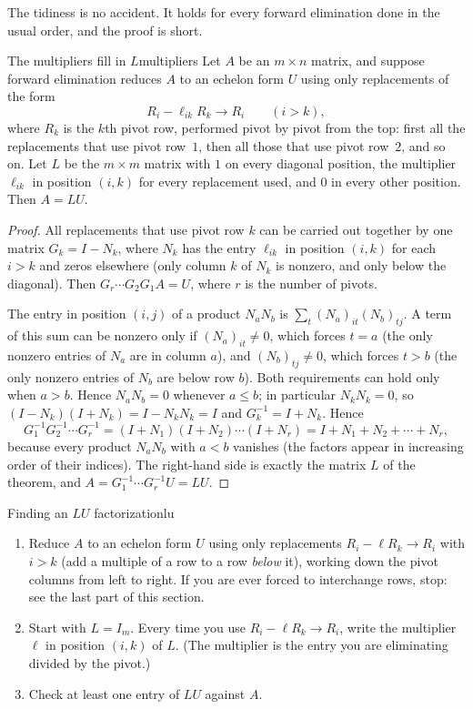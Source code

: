 \documentclass[11pt]{article}
\begin{document}
The tidiness is no accident. It holds for every forward elimination done in the usual order, and the proof is short.

\begin{thm}{The multipliers fill in $L$}{multipliers}
Let $A$ be an $m\times n$ matrix, and suppose forward elimination reduces $A$ to an echelon form $U$ using only replacements of the form
\[
R_i-\ell_{ik}R_k\to R_i\qquad(i>k),
\]
where $R_k$ is the $k$th pivot row, performed pivot by pivot from the top: first all the replacements that use pivot row~$1$, then all those that use pivot row~$2$, and so on. Let $L$ be the $m\times m$ matrix with $1$ on every diagonal position, the multiplier $\ell_{ik}$ in position $(i,k)$ for every replacement used, and $0$ in every other position. Then $A=LU$.
\end{thm}

\begin{proof}
All replacements that use pivot row $k$ can be carried out together by one matrix $G_k=I-N_k$, where $N_k$ has the entry $\ell_{ik}$ in position $(i,k)$ for each $i>k$ and zeros elsewhere (only column $k$ of $N_k$ is nonzero, and only below the diagonal). Then $G_r\cdots G_2G_1A=U$, where $r$ is the number of pivots.

The entry in position $(i,j)$ of a product $N_aN_b$ is $\sum_t(N_a)_{it}(N_b)_{tj}$. A term of this sum can be nonzero only if $(N_a)_{it}\neq0$, which forces $t=a$ (the only nonzero entries of $N_a$ are in column $a$), and $(N_b)_{tj}\neq0$, which forces $t>b$ (the only nonzero entries of $N_b$ are below row $b$). Both requirements can hold only when $a>b$. Hence $N_aN_b=0$ whenever $a\le b$; in particular $N_kN_k=0$, so $(I-N_k)(I+N_k)=I-N_kN_k=I$ and $G_k^{-1}=I+N_k$. Hence
\[
G_1^{-1}G_2^{-1}\cdots G_r^{-1}=(I+N_1)(I+N_2)\cdots(I+N_r)=I+N_1+N_2+\cdots+N_r ,
\]
because every product $N_aN_b$ with $a<b$ vanishes (the factors appear in increasing order of their indices). The right-hand side is exactly the matrix $L$ of the theorem, and $A=G_1^{-1}\cdots G_r^{-1}U=LU$.
\end{proof}

\begin{proc}{Finding an $LU$ factorization}{lu}
\begin{enumerate}
  \item Reduce $A$ to an echelon form $U$ using only replacements $R_i-\ell R_k\to R_i$ with $i>k$ (add a multiple of a row to a row \emph{below} it), working down the pivot columns from left to right. If you are ever forced to interchange rows, stop: see the last part of this section.
  \item Start with $L=I_m$. Every time you use $R_i-\ell R_k\to R_i$, write the multiplier $\ell$ in position $(i,k)$ of $L$. (The multiplier is the entry you are eliminating divided by the pivot.)
  \item Check at least one entry of $LU$ against $A$.
\end{enumerate}
\end{proc}
\end{document}
